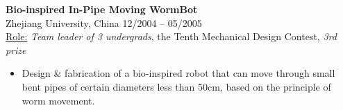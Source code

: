 \documentclass{res}
\begin{document}
\begin{resume}
{\bf Bio-inspired In-Pipe Moving WormBot}  \\
Zhejiang University, China  \hfill 12/2004 -- 05/2005 \\
\underline{Role:} \emph{Team leader of 3 undergrads}, the Tenth Mechanical Design Contest, \emph{3rd prize}

\begin{itemize}
	\item Design \& fabrication of a bio-inspired robot that can move through small bent pipes
	of certain diameters less than 50cm, based on the principle of worm movement.
\end{itemize}
%
%



\end{resume}
\end{document}
